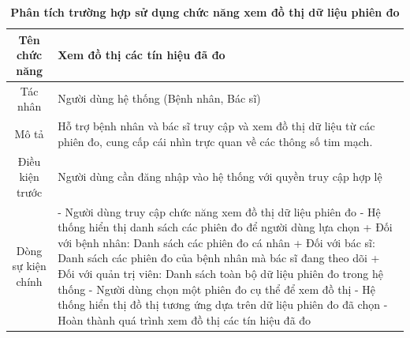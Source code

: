 \begin{table}[H]
	\caption{\bfseries \fontsize{12pt}{0pt}\selectfont Phân tích trường hợp sử dụng chức năng xem đồ thị dữ liệu phiên đo}
	\centering
	\begin{tabularx}{0.9\textwidth}{|c|X|}
		\hline
		\textbf{Tên chức năng} & \textbf{Xem đồ thị các tín hiệu đã đo}                                                                                           \\
		\hline
		Tác nhân               & Người dùng hệ thống (Bệnh nhân, Bác sĩ)                                                                                          \\
		\hline
		Mô tả                  & Hỗ trợ bệnh nhân và bác sĩ truy cập và xem đồ thị dữ liệu từ các phiên đo, cung cấp cái nhìn trực quan về các thông số tim mạch. \\
		\hline
		Điều kiện trước        & Người dùng cần đăng nhập vào hệ thống với quyền truy cập hợp lệ                                                                  \\
		\hline
		Dòng sự kiện chính     &
		- Người dùng truy cập chức năng xem đồ thị dữ liệu phiên đo \newline
		- Hệ thống hiển thị danh sách các phiên đo để người dùng lựa chọn \newline
		+ Đối với bệnh nhân: Danh sách các phiên đo cá nhân \newline
		+ Đối với bác sĩ: Danh sách các phiên đo của bệnh nhân mà bác sĩ đang theo dõi \newline
		+ Đối với quản trị viên: Danh sách toàn bộ dữ liệu phiên đo trong hệ thống \newline
		- Người dùng chọn một phiên đo cụ thể để xem đồ thị \newline
		- Hệ thống hiển thị đồ thị tương ứng dựa trên dữ liệu phiên đo đã chọn \newline
		- Hoàn thành quá trình xem đồ thị các tín hiệu đã đo                                                                                                      \\
		\hline
	\end{tabularx}
\end{table}

